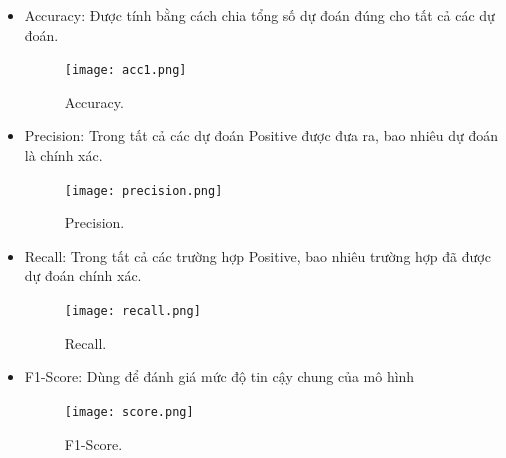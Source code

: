 \begin{itemize}
	\item Accuracy: Được tính bằng cách chia tổng số dự đoán đúng cho tất cả các dự đoán.
	
	\begin{figure}[h!]
		\centering
		\texttt{[image: acc1.png]}
		\caption[Accuracy.]{Accuracy.}
		\label{fig:acc} 
	\end{figure}
		
	\item Precision: Trong tất cả các dự đoán Positive được đưa ra, bao nhiêu dự đoán là chính xác.
	
	\begin{figure}[h!]
		\centering
		\texttt{[image: precision.png]}
		\caption[Precision.]{Precision.}
		\label{fig:precision} 
	\end{figure}
	
	\item Recall: Trong tất cả các trường hợp Positive, bao nhiêu trường hợp đã được dự đoán chính xác.		
	
	\begin{figure}[h!]
		\centering
		\texttt{[image: recall.png]}
		\caption[Recall.]{Recall.}
		\label{fig:recall} 
	\end{figure}

	\item F1-Score: Dùng để đánh giá mức độ tin cậy chung của mô hình
	
	\begin{figure}[h!]
		\centering
		\texttt{[image: score.png]}
		\caption[F1-Score.]{F1-Score.}
		\label{fig:score} 
	\end{figure}
\end{itemize}








